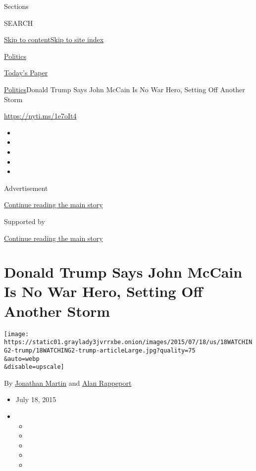 Sections

SEARCH

\protect\hyperlink{site-content}{Skip to
content}\protect\hyperlink{site-index}{Skip to site index}

\href{https://www.nytimes3xbfgragh.onion/section/politics}{Politics}

\href{https://myaccount.nytimes3xbfgragh.onion/auth/login?response_type=cookie\&client_id=vi}{}

\href{https://www.nytimes3xbfgragh.onion/section/todayspaper}{Today's
Paper}

\href{/section/politics}{Politics}\textbar{}Donald Trump Says John
McCain Is No War Hero, Setting Off Another Storm

\url{https://nyti.ms/1e7oIt4}

\begin{itemize}
\item
\item
\item
\item
\item
\end{itemize}

Advertisement

\protect\hyperlink{after-top}{Continue reading the main story}

Supported by

\protect\hyperlink{after-sponsor}{Continue reading the main story}

\hypertarget{donald-trump-says-john-mccain-is-no-war-hero-setting-off-another-storm}{%
\section{Donald Trump Says John McCain Is No War Hero, Setting Off
Another
Storm}\label{donald-trump-says-john-mccain-is-no-war-hero-setting-off-another-storm}}

\texttt{[image: https://static01.graylady3jvrrxbe.onion/images/2015/07/18/us/18WATCHING2-trump/18WATCHING2-trump-articleLarge.jpg?quality=75\\\&auto=webp\\\&disable=upscale]}

By \href{http://www.nytimes3xbfgragh.onion/by/jonathan-martin}{Jonathan
Martin} and
\href{https://www.nytimes3xbfgragh.onion/by/alan-rappeport}{Alan
Rappeport}

\begin{itemize}
\item
  July 18, 2015
\item
  \begin{itemize}
  \item
  \item
  \item
  \item
  \item
  \end{itemize}
\end{itemize}

